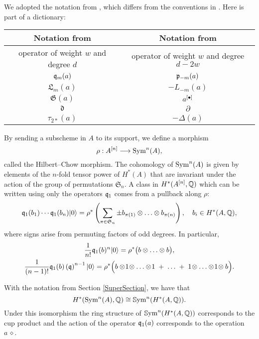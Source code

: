 \begin{remark}
We adopted the notation from \cite{LiQinWang}, which differs from the conventions in \cite{LehnSorger}. Here is part of a dictionary:
\begin{center}
\begin{tabular}{c|c} 
Notation from \cite{LiQinWang} & Notation from \cite{LehnSorger} \\\hline
operator of weight $w$ and degree $d$ & operator of weight $w$ and degree $d-2w$\\
$\mathfrak{q}_m(a) $ & $\mathfrak{p}_{-m}(a)$ \\
$ \mathfrak{L}_m(a) $ & $ - L_{-m}(a)$ \\
$\mathfrak{G}(a)$ & $a^{[\bullet]}$\\
$ \mathfrak{d} $ & $ \partial $ \\
$\tau_{2*}(a)$& $-\Delta(a)$
\end{tabular}
\end{center}
\end{remark}

By sending a subscheme in $A$ to its support, we define a morphism
$$
\rho : A^{[n]} \longrightarrow \operatorname{Sym}^n(A),
$$
called the Hilbert--Chow morphism. The cohomology of $\operatorname{Sym}^n(A)$ is given by elements of the $n$-fold tensor power of $H^*(A)$ that are invariant under the action of the group of permutations $\mathfrak{S}_n$. A class in $H^*(A^{[n]},\mathbb{Q})$ which can be written using only the operators $\mathfrak{q}_1$ comes from a pullback along $\rho$:
\begin{equation}
\label{qSym}
\mathfrak{q}_1(b_1)\cdots \mathfrak{q}_1(b_n)|0\rangle = \rho^*\left( \sum_{\pi\in\mathfrak{S}_n } \pm b_{\pi(1)}\otimes\ldots\otimes b_{\pi(n)} \right), \quad b_i\in H^*(A,\mathbb{Q}),
\end{equation}
where signs arise from permuting factors of odd degrees. In particular,
\begin{gather} \label{q0primitive}
\frac{1}{n!}\mathfrak{q}_1(b)^n |0\rangle = \rho^*\big( b\otimes \ldots \otimes b\big),
\\ \label{q1primitive}
\frac{1}{(n-1)!}\mathfrak{q}_1(b)\left(\mathfrak{q}\right)^{n-1}|0\rangle =\rho^*\Big( b\otimes\! 1\!\otimes\ldots\otimes\! 1\; + \;\ldots\; +\; 1\!\otimes\ldots\otimes\! 1\! \otimes b\Big) .
\end{gather}
\begin{remark}
With the notation from Section \ref{SuperSection}, we have that
$$
H^*(\operatorname{Sym}^n(A),\mathbb{Q}) \cong \operatorname{\mathbb{S}ym}^n(H^*(A,\mathbb{Q})).
$$
Under this isomorphism the ring structure of $\operatorname{\mathbb{S}ym}^n(H^*(A,\mathbb{Q}))$ corresponds to the cup product and the action of the operator $\mathfrak{q}_1(a)$ corresponds to the operation $a\,\diamond$.
\end{remark}

